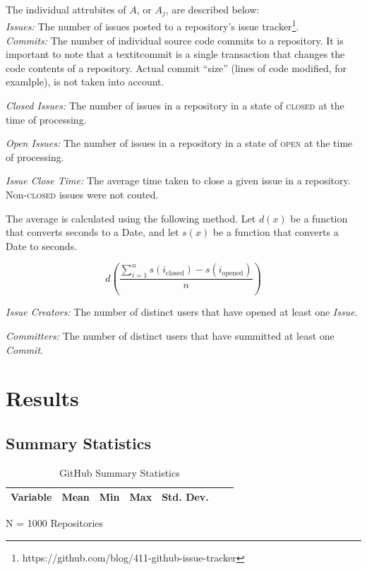 \documentclass{proc}
\begin{document}
The individual attrubites of $A$, or $A_j$, are described below:\\
\textit{Issues:}
The number of issues posted to a repository's issue tracker\footnote{https://github.com/blog/411-github-issue-tracker}.\\

\textit{Commits:}
The number of individual source code commits to a repository. It is important to note that a textit{commit} is a single transaction that changes the code contents of a repository. Actual commit ``size'' (lines of code modified, for examlple), is not taken into account.

\textit{Closed Issues:}
The number of issues in a repository in a state of \textsc{closed} at the time of processing.

\textit{Open Issues:}
The number of issues in a repository in a state of \textsc{open} at the time of processing.

\textit{Issue Close Time:}
The average time taken to close a given issue in a repository. Non-\textsc{closed} issues were not couted.

The average is calculated using the following method. Let $d(x)$ be a function that converts seconds to a Date, and let $s(x)$ be a function that converts a Date to seconds.

\[ d\left( \frac{\sum\limits_{i=1}^{n} s(i_{\textrm{closed}}) - s(i_{\textrm{opened}})  } {n} \right) \]

\textit{Issue Creators:}
The number of distinct users that have opened at least one \textit{Issue}.

\textit{Committers:}
The number of distinct users that have summitted at least one \textit{Commit}.

\section{Results}

\subsection{Summary Statistics}
\begin{table}[!ht]
\begin{center}
\begin{tabular}{rrrrrrr}
\hline
Variable & Mean & Min & Max & Std. Dev. \\
\hline

\hline
\end{tabular}
N = 1000 Repositories
\caption{GitHub Summary Statistics}
\label{table:summary_stats}
\end{center}
\end{table}
\end{document}
